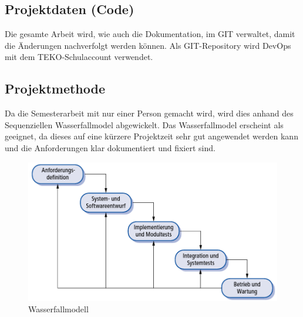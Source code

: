 \subsection{Projektdaten (Code)}
Die gesamte Arbeit wird, wie auch die Dokumentation, im GIT verwaltet, damit die Änderungen nachverfolgt werden können. Als GIT-Repository wird DevOps mit dem TEKO-Schulaccount verwendet.

\subsection{Projektmethode}
Da die Semesterarbeit mit nur einer Person gemacht wird, wird dies anhand des Sequenziellen Wasserfallmodel abgewickelt. Das Wasserfallmodel erscheint als geeignet, da dieses auf eine kürzere Projektzeit sehr gut angewendet werden kann und die Anforderungen klar dokumentiert und fixiert sind.

\begin{figure}[htp]
    \begin{center}
        \includegraphics[width=0.5\linewidth]{content/images/wasserfallmodell.png}
        \caption{Wasserfallmodell}
        \label{fig:wasserfallmodell}
      \end{center}
\end{figure}

